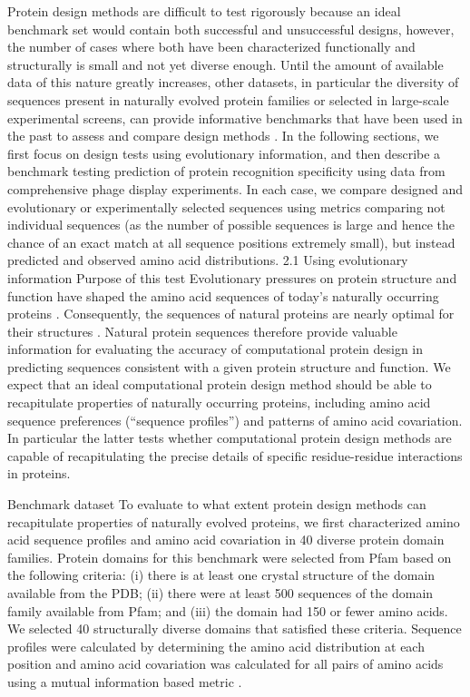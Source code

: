 Protein design methods are difficult to test rigorously because an ideal benchmark set would contain both successful and unsuccessful designs, however, the number of cases where both have been characterized functionally and structurally is small and not yet diverse enough. Until the amount of available data of this nature greatly increases, other datasets, in particular the diversity of sequences present in naturally evolved protein families or selected in large-scale experimental screens, can provide informative benchmarks that have been used in the past to assess and compare design methods
\cite{ollikainen_computational_2013,ollikainen_chapter_2013}. In the following sections, we first focus on design tests using evolutionary information, and then describe a benchmark testing prediction of protein recognition specificity using data from comprehensive phage display experiments. In each case, we compare designed and evolutionary or experimentally selected sequences using metrics comparing not individual sequences (as the number of possible sequences is large and hence the chance of an exact match at all sequence positions extremely small), but instead predicted and observed amino acid distributions.
2.1 Using evolutionary information
Purpose of this test
Evolutionary pressures on protein structure and function have shaped the amino acid sequences of today's naturally occurring proteins \cite{dokholyan_understanding_2001}. Consequently, the sequences of natural proteins are nearly optimal for their structures \cite{kuhlman_native_2000}. Natural protein sequences therefore provide valuable information for evaluating the accuracy of computational protein design in predicting sequences consistent with a given protein structure and function. We expect that an ideal computational protein design method should be able to recapitulate properties of naturally occurring proteins, including amino acid sequence preferences (“sequence profiles”) and patterns of amino acid covariation. In particular the latter tests whether computational protein design methods are capable of recapitulating the precise details of specific residue-residue interactions in proteins.

Benchmark dataset
To evaluate to what extent protein design methods can recapitulate properties of naturally evolved proteins, we first characterized amino acid sequence profiles and amino acid covariation in 40 diverse protein domain families. Protein domains for this benchmark were selected from Pfam \cite{finn_pfam:_2014} based on the following criteria: (i) there is at least one crystal structure of the domain available from the PDB; (ii) there were at least 500 sequences of the domain family available from Pfam; and (iii) the domain had 150 or fewer amino acids. We selected 40 structurally diverse domains that satisfied these criteria. Sequence profiles were calculated by determining the amino acid distribution at each position and amino acid covariation was calculated for all pairs of amino acids using a mutual information based metric \cite{dickson_identifying_2010}.

